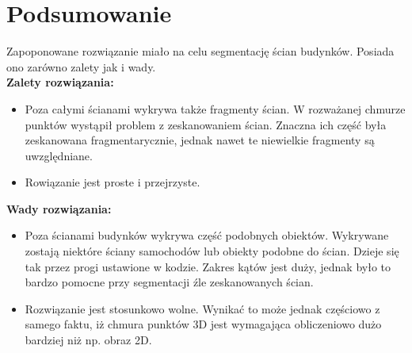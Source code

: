 	\chapter{Podsumowanie}
	Zapoponowane rozwiązanie miało na celu segmentację ścian budynków. Posiada ono zarówno zalety jak i wady.\\
	\textbf{Zalety rozwiązania:}
	\begin{itemize}%
		\item Poza całymi ścianami wykrywa także fragmenty ścian. W rozważanej chmurze punktów wystąpił problem z zeskanowaniem ścian. Znaczna ich część była zeskanowana fragmentarycznie, jednak nawet te niewielkie fragmenty są uwzględniane.
		\item Rowiązanie jest proste i przejrzyste.
	\end{itemize}
	\textbf{Wady rozwiązania:}
	\begin{itemize}
		\item Poza ścianami budynków wykrywa część podobnych obiektów. Wykrywane zostają niektóre ściany samochodów lub obiekty podobne do ścian. Dzieje się tak przez progi ustawione w kodzie. Zakres kątów jest duży, jednak było to bardzo pomocne przy segmentacji źle zeskanowanych ścian.
		\item Rozwiązanie jest stosunkowo wolne. Wynikać to może jednak częściowo z samego faktu, iż chmura punktów 3D jest wymagająca obliczeniowo dużo bardziej niż np. obraz 2D. 
	\end{itemize}